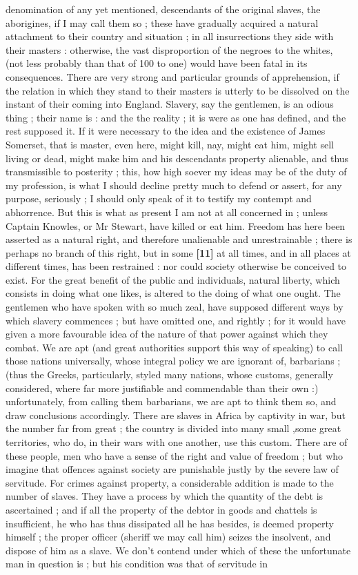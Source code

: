 \documentclass[a4paper]{article}
\begin{document}
denomination of any yet mentioned, descendants of the original slaves, the aborigines, if I may call them so ; these have gradually acquired a natural attachment to their country and situation ; in all insurrections they side with their masters : otherwise, the vast disproportion of the negroes to the whites, (not less probably than that of 100 to one) would have been fatal in its consequences. There are very strong and particular grounds of apprehension, if the relation in which they stand to their masters is utterly to be dissolved on the instant of their coming into England. Slavery, say the gentlemen, is an odious thing ; their name is : and the the reality ; it is were as one has defined, and the rest supposed it. If it were necessary to the idea and the existence of James Somerset, that is master, even here, might kill, nay, might eat him, might sell living or dead, might make him and his descendants property alienable, and thus transmissible to posterity ; this, how high soever my ideas may be of the duty of my profession, is what I should decline pretty much to defend or assert, for any purpose, seriously ; I should only speak of it to testify my contempt and abhorrence. But this is what as present I am not at all concerned in ; unless Captain Knowles, or Mr Stewart, have killed or eat him. Freedom has here been asserted as a natural right, and therefore unalienable and unrestrainable ; there is perhaps no branch of this right, but in some \textbf{[11]} at all times, and in all places at different times, has been restrained : nor could society otherwise be conceived to exist. For the great benefit of the public and individuals, natural liberty, which consists in doing what one likes, is altered to the doing of what one ought. The gentlemen who have spoken with so much zeal, have supposed different ways by which slavery commences ; but have omitted one, and rightly ; for it would have given a more favourable idea of the nature of that power against which they combat. We are apt (and great authorities support this way of speaking) to call those nations universally, whose integral policy we are ignorant of, barbarians ; (thus the Greeks, particularly, styled many nations, whose customs, generally considered, where far more justifiable and commendable than their own :) unfortunately, from calling them barbarians, we are apt to think them so, and draw conclusions accordingly. There are slaves in Africa by captivity in war, but the number far from great ; the country is divided into many small ,some great territories, who do, in their wars with one another, use this custom. There are of these people, men who have a sense of the right and value of freedom ; but who imagine that offences against society are punishable justly by the severe law of servitude. For crimes against property, a considerable addition is made to the number of slaves. They have a process by which the quantity of the debt is ascertained ; and if all the property of the debtor in goods and chattels is insufficient, he who has thus dissipated all he has besides, is deemed property himself ; the proper officer (sheriff we may call him) seizes the insolvent, and dispose of him as a slave. We don't contend under which of these the unfortunate man in question is ; but his condition was that of servitude in 
\end{document}
